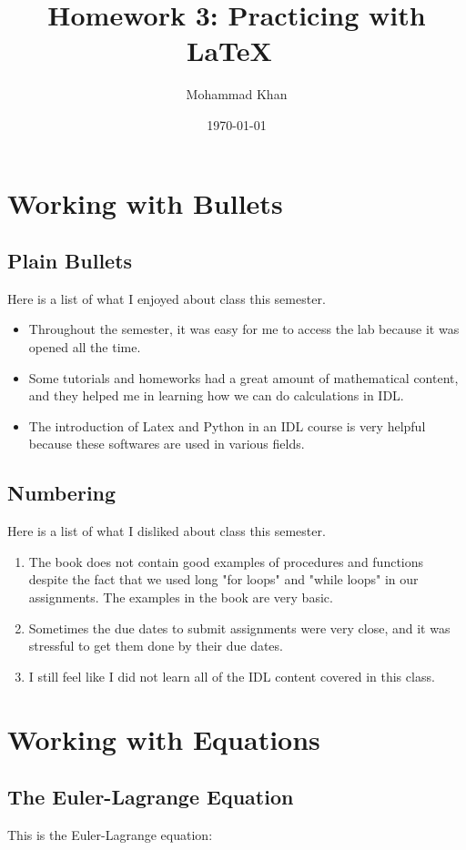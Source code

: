 \documentclass[12pt]{article}
\title{Homework 3: Practicing with \LaTeX\ }
\author{Mohammad Khan}
\date{\today}
\begin{document}
\maketitle

\section{Working with Bullets}

\subsection{Plain Bullets}

Here is a list of what I enjoyed about class this semester.
\begin{itemize}
\item Throughout the semester, it was easy for me to access the lab because it was opened all the time.
\item Some tutorials and homeworks had a great amount of mathematical content, and they helped me in learning how we can do calculations in IDL. 
\item The introduction of Latex and Python in an IDL course is very helpful because these softwares are used in various fields.
\end{itemize}

\subsection{Numbering}
Here is a list of what I disliked about class this semester.
\begin{enumerate}
\item The book does not contain good examples of procedures and functions despite the fact that we used long "for loops" and "while loops" in our assignments. The examples in the book are very basic.
\item Sometimes the due dates to submit assignments were very close, and it was stressful to get them done by their due dates.
\item I still feel like I did not learn all of the IDL content covered in this class. 
\end{enumerate}

\section{Working with Equations}

\subsection{The Euler-Lagrange Equation}
This is the Euler-Lagrange equation:
\end{document}
